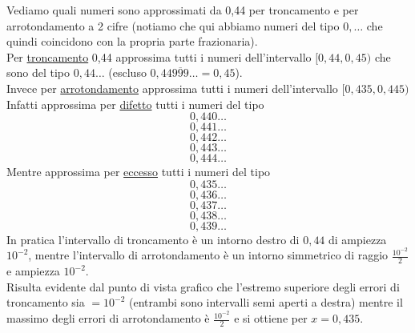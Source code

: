 \documentclass[12pt]{article}
\begin{document}
Vediamo quali numeri sono approssimati da 0,44 per troncamento e per arrotondamento a 2 cifre (notiamo che qui abbiamo numeri del tipo $0,\dotsc$ che quindi coincidono con la propria parte frazionaria).\\
Per \underline{troncamento} 0,44 approssima tutti i numeri dell'intervallo $[0,44 , 0,45)$ che sono del tipo $0,44\dotsc$ (escluso $0,44\overline{999}\dotsc = 0,45$).\\
Invece per \underline{arrotondamento} approssima tutti i numeri dell'intervallo $[0,435 , 0,445)$ \\ 
Infatti approssima per \underline{difetto} tutti i numeri del tipo \[ 0,440\dotsc \] \[ 0,441\dotsc \] \[ 0,442\dotsc \] \[ 0,443\dotsc \] \[ 0,444\dotsc \]
Mentre approssima per \underline{eccesso} tutti i numeri del tipo \[ 0,435\dotsc \] \[ 0,436\dotsc \] \[ 0,437\dotsc \] \[ 0,438\dotsc \] \[ 0,439\dotsc \]
In pratica l'intervallo di troncamento è un intorno destro di $0,44$ di ampiezza $10^{-2}$, mentre l'intervallo di arrotondamento è un intorno simmetrico di raggio $\frac{10^{-2}}{2}$ e ampiezza $10^{-2}$.\\
Risulta evidente dal punto di vista grafico che l'estremo superiore degli errori di troncamento sia $= 10^{-2}$ (entrambi sono intervalli semi aperti a destra) mentre il massimo degli errori di arrotondamento è $\frac{10^{-2}}{2}$ e si ottiene per $x = 0,435$.
\end{document}
